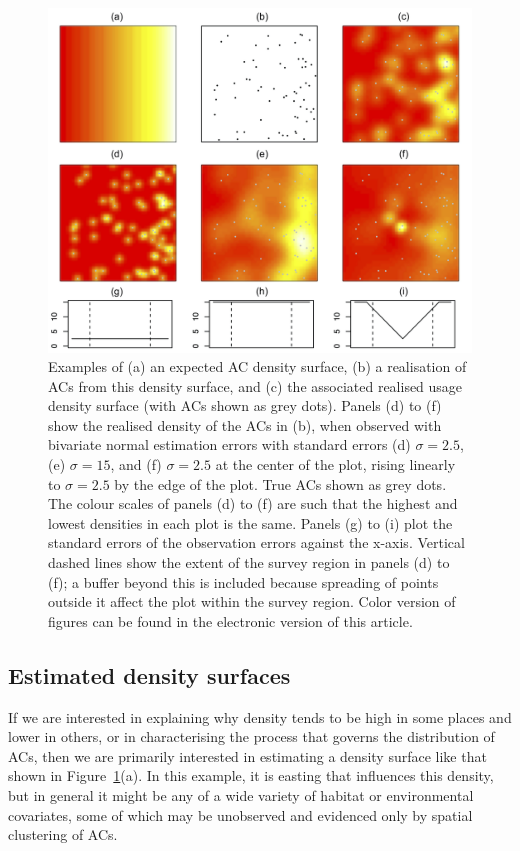 \documentclass[useAMS,usenatbib,referee]{biom}
\begin{document}
\begin{figure}[htbp]
\centering
\includegraphics[width=\textwidth]{example-densities.jpg}
\caption{Examples of (a) an expected AC density surface, (b) a realisation of ACs from this density surface, and (c) the associated realised usage density surface (with ACs shown as grey dots). Panels (d) to (f) show the realised density of the ACs in (b), when observed with bivariate normal estimation errors with standard errors (d) $\sigma=2.5$, (e) $\sigma=15$, and (f) $\sigma=2.5$ at the center of the plot, rising linearly to $\sigma=2.5$ by the edge of the plot. True ACs shown as grey dots. The colour scales of panels (d) to (f) are such that the highest and lowest densities in each plot is the same. Panels (g) to (i) plot the standard errors of the observation errors against the x-axis. Vertical dashed lines show the extent of the survey region in panels (d) to (f); a buffer beyond this is included because spreading of points outside it affect the plot within the survey region. Color version of figures can be found in the electronic version of this article.}
\label{fig:densities}
\end{figure}

\subsection{Estimated density surfaces}

If we are interested in explaining why density tends to be high in some places and lower in others, or in characterising the process that governs the distribution of ACs, then we are primarily interested in estimating a density surface like that shown in Figure~\ref{fig:densities}(a). In this example, it is easting that influences this density, but in general it might be any of a wide variety of habitat or environmental covariates, some of which may be unobserved and evidenced only by spatial clustering of ACs. 
\end{document}
